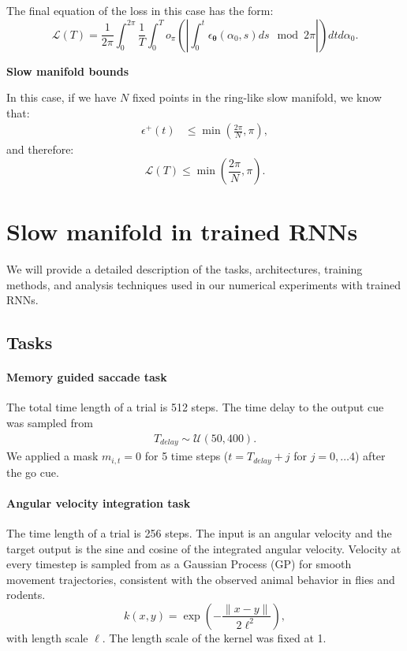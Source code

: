 \documentclass{article} %
\newcounter{ct}
\theoremstyle{definition}
\theoremstyle{remark}
\begin{document}
The final equation of the loss in this case has the form:
\begin{equation}
    \mathcal{L}(T) =  \frac{1}{2 \pi} \int_0^{2 \pi} \frac{1}{T} \int_0^T o_\pi \left( \left| \int_0^t \epsilon_{\bm{\theta}}(\alpha_0, s) ds \mod 2 \pi \right| \right) dt d\alpha_0.
\end{equation}

\textbf{Slow manifold bounds}

In this case, if we have \(N\) fixed points in the ring-like slow manifold, we know that:
\begin{equation}
\begin{split}
     \epsilon^+(t) &\leq \min \left( \frac{2 \pi}{N}, \pi \right),
\end{split}
\end{equation}
and therefore:
\begin{equation}
    \mathcal{L}(T) \leq \min \left( \frac{2 \pi}{N}, \pi \right).
\end{equation}



\newpage
\section{Slow manifold in trained RNNs}
We will provide a detailed description of the tasks, architectures, training methods, and analysis techniques used in our numerical experiments with trained RNNs.
\subsection{Tasks}\label{sec:supp:tasks}
\paragraph{Memory guided saccade task}

The total time length of a trial is 512 steps.
The time delay to the output cue was sampled from
\begin{align}
T_{delay} \sim \mathcal{U}(50, 400).
\end{align}
We applied a mask \(m_{i,t}=0\) for 5 time steps (\(t=T_{delay}+j\) for \(j=0,\dots 4\)) after the go cue.



\paragraph{Angular velocity integration task}
The time length of a trial is 256 steps.
The input is an angular velocity and the target output is the sine and cosine of the integrated angular velocity.
Velocity at every timestep  is sampled from as a Gaussian Process (GP) for smooth movement trajectories, consistent with the observed animal behavior in flies and rodents.
\begin{equation}
k(x,y)=\exp\left(-\frac{\|x-y\|}{2\ell^2}\right),
\end{equation}
with length scale \(\ell\).
 The length scale of the kernel was fixed at 1.
\end{document}
